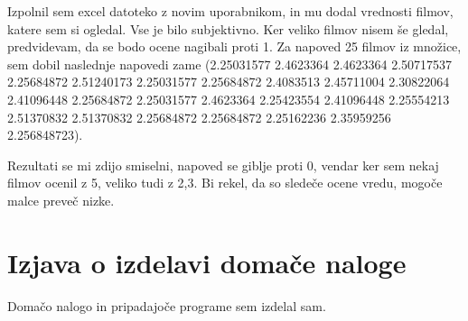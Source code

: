 \documentclass[a4paper,11pt]{article}
\begin{document}
Izpolnil sem excel datoteko z novim uporabnikom, in mu dodal vrednosti filmov, katere sem si ogledal. Vse je bilo subjektivno. Ker veliko filmov nisem še gledal, predvidevam, da se bodo ocene nagibali proti 1. Za napoved 25 filmov iz množice, sem dobil naslednje napovedi zame (2.25031577  2.4623364   2.4623364   2.50717537  2.25684872  2.51240173
2.25031577  2.25684872  2.4083513   2.45711004  2.30822064  2.41096448
2.25684872  2.25031577  2.4623364   2.25423554  2.41096448  2.25554213
2.51370832  2.51370832  2.25684872  2.25684872  2.25162236  2.35959256
2.256848723).

Rezultati se mi zdijo smiselni, napoved se giblje proti 0, vendar ker sem nekaj filmov ocenil z 5, veliko tudi z 2,3. Bi rekel, da so sledeče ocene vredu, mogoče malce preveč nizke.


\section{Izjava o izdelavi domače naloge}
Domačo nalogo in pripadajoče programe sem izdelal sam.
\end{document}
